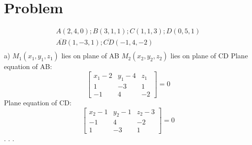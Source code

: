 \documentclass[11pt]{article}
\begin{document}
    \section{Problem}
    \begin{gather*}
        A(2,4,0); B(3,1,1); C(1,1,3); D(0,5,1)\\
        \overline{AB}(1,-3,1); \overline{CD}(-1,4,-2)\\
    \end{gather*}
    a) \newline %
    \(M_1(x_1,y_1,z_1)\) lies on plane of AB \newline
    \(M_2(x_2,y_2,z_2)\) lies on plane of CD \newline
    Plane equation of AB: \newline
    \[\begin{bmatrix}
        x_1-2 & y_1-4 & z_1\\
        1     & -3    & 1  \\
        -1    & 4     & -2
    \end{bmatrix}=0 \]
    Plane equation of CD: \newline
    \[\begin{bmatrix}
          x_2-1 & y_2-1 & z_2-3\\
          -1    & 4     & -2   \\
          1     & -3    &  1
    \end{bmatrix}=0 \]
    . . .
\end{document}
